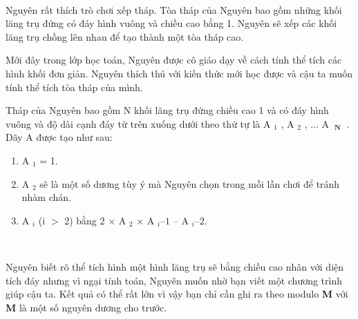  

Nguyên rất thích trò chơi xếp tháp. Tòa tháp của Nguyên bao gồm những khối lăng trụ đứng có đáy hình vuông và chiều cao bằng 1. Nguyên sẽ xếp các khối lăng trụ chồng lên nhau để tạo thành một tòa tháp cao.

Mới đây trong lớp học toán, Nguyên được cô giáo dạy về cách tính thể tích các hình khối đơn giản. Nguyên thích thú với kiến thức mới học được và cậu ta muốn tính thể tích tòa tháp của mình.

Tháp của Nguyên bao gồm N khối lăng trụ đứng chiều cao 1 và có đáy hình vuông và độ dài cạnh đáy từ trên xuống dưới theo thứ tự là A $_ 1 $ , A­­­ $_ 2 $ , ... A­­ $_\textbf{ N }$ . Dãy A được tạo như sau:
\begin{enumerate}
	\item A $_ 1 $ = 1.
	\item A $_ 2 $ sẽ là một số dương tùy ý mà Nguyên chọn trong mỗi lần chơi để tránh nhàm chán.
	\item A $_ i $ (i $>$ 2) bằng 2 × A $_ 2 $ × A $_ i  – 1 $ – A­ $_ i – 2. $
\end{enumerate}

 

Nguyên biết rõ thể tích hình một hình lăng trụ sẽ bằng chiều cao nhân với diện tích đáy nhưng vì ngại tính toán, Nguyên muốn nhờ bạn viết một chương trình giúp cậu ta. Kết quả có thể rất lớn vì vậy bạn chỉ cần ghi ra theo modulo \textbf{ M } với \textbf{ M } là một số nguyên dương cho trước.